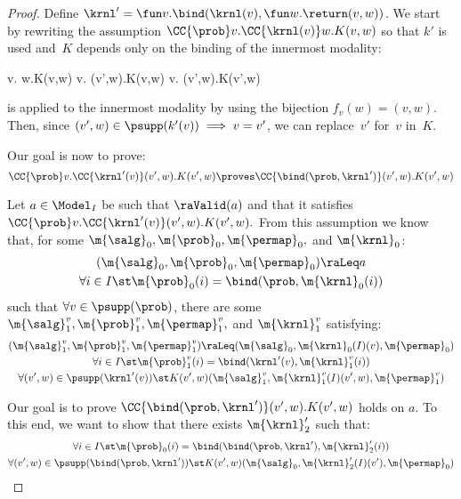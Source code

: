 \documentclass[acmsmall,nonacm,screen,appendix]{acmart}
\begin{document}
\begin{proof}
  Define $\krnl' = \fun v . \bind(\krnl(v), \fun w . \return(v, w))$.
  We start by rewriting the assumption $\CC{\prob} v.\CC{\krnl(v)} w.K(v,w)$ so that $k'$ is used and~$K$ depends only on the binding of the innermost modality:
  \begin{eqexplain}
    \CC{\prob} v. w.K(v,w)
    \whichproves*
    \CC{\prob} v. (v',w).K(v,w)
    \whichproves
    \CC{\prob} v. (v',w).K(v',w)
  \end{eqexplain}
   is applied to the innermost modality
  by using the bijection $f_v(w) = (v,w)$.
  Then, since $(v',w) \in \psupp(k'(v)) \implies v=v'$,
  we can replace~$v'$ for~$v$ in~$K$.

  Our goal is now to prove:
  \[
    \CC{\prob} v.\CC{\krnl'(v)} (v',w).K(v',w)
    \proves
    \CC{\bind(\prob,\krnl')} (v',w).K(v',w)
  \]

  Let $a\in\Model_I$ be such that $ \raValid(a) $ and that it satisfies
  $ \CC{\prob} v.\CC{\krnl'(v)} (v',w).K(v',w). $
  From this assumption we know that,
  for some $ \m{\salg}_0, \m{\prob}_0,\m{\permap}_0,$ and $ \m{\krnl}_0 $:
  \begin{gather}
    (\m{\salg}_0, \m{\prob}_0,\m{\permap}_0) \raLeq a
    \label{c-assoc:prob0}
    \\
    \forall i\in I\st
      \m{\prob}_0(i) = \bind(\prob, \m{\krnl}_0(i))
    \label{c-assoc:prob0-bind}
  \end{gather}
  such that $\forall v \in \psupp(\prob)$,
  there are some
  $ \m{\salg}_1^v, \m{\prob}_1^v,\m{\permap}_1^v,$ and $ \m{\krnl}_1^v $
  satisfying:
  \begin{gather}
    (\m{\salg}_1^v, \m{\prob}_1^v,\m{\permap}_1^v)
    \raLeq
    (\m{\salg}_0, \m{\krnl}_0(I)(v),\m{\permap}_0)
    \label{c-assoc:prob1}
    \\
    \forall i\in I\st
      \m{\prob}_1^v(i) = \bind(\krnl'(v), \m{\krnl}_1^v(i))
    \label{c-assoc:prob1-bind}
    \\
    \forall (v',w) \in \psupp(\krnl'(v)) \st
      K(v',w)(\m{\salg}_1^v, \m{\krnl}_1^v(I)(v',w), \m{\permap}_1^v)
    \label{c-assoc:K-krnl1}
  \end{gather}

  Our goal is to prove
  $ \CC{\bind(\prob,\krnl')} (v',w).K(v',w) $ holds on $a$.
  To this end, we want to show that
  there exists $\m{\krnl}_2'$ such that:
\begin{gather}
    \forall i\in I\st
      \m{\prob}_0(i) = \bind(\bind(\prob,\krnl'), \m{\krnl}_2'(i))
    \label{c-assoc:goal1}
    \\
    \forall (v',w) \in \psupp(\bind(\prob,\krnl')) \st
      K(v', w)(\m{\salg}_0 , \m{\krnl}_2'(I) (v'), \m{\permap}_0)
    \label{c-assoc:goal2}
  \end{gather}


\end{proof}
\end{document}
